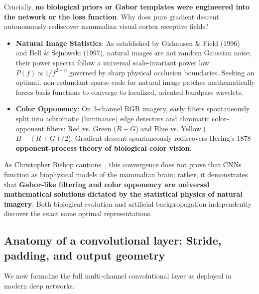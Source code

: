 Crucially, \textbf{no biological priors or Gabor templates were engineered into the network or the loss function}. Why does pure gradient descent autonomously rediscover mammalian visual cortex receptive fields?
\begin{itemize}[leftmargin=*]
  \item \textbf{Natural Image Statistics}: As established by Olshausen \& Field (1996)~\cite{olshausen1996emergence} and Bell \& Sejnowski (1997), natural images are not random Gaussian noise; their power spectra follow a universal scale-invariant power law $P(f) \propto 1/f^{2-\eta}$ governed by sharp physical occlusion boundaries. Seeking an optimal, non-redundant sparse code for natural image patches mathematically forces basis functions to converge to localized, oriented bandpass wavelets.
  \item \textbf{Color Opponency}: On 3-channel RGB imagery, early filters spontaneously split into achromatic (luminance) edge detectors and chromatic color-opponent filters: Red vs. Green ($R - G$) and Blue vs. Yellow ($B - (R+G)/2$). Gradient descent spontaneously rediscovers Hering's 1878 \textbf{opponent-process theory of biological color vision}.
\end{itemize}

As Christopher Bishop cautions~\cite{bishop2024deep}, this convergence does not prove that CNNs function as biophysical models of the mammalian brain; rather, it demonstrates that \textbf{Gabor-like filtering and color opponency are universal mathematical solutions dictated by the statistical physics of natural imagery}. Both biological evolution and artificial backpropagation independently discover the exact same optimal representations.

\subsection{Anatomy of a convolutional layer: Stride, padding, and output geometry}
\label{sec:conv_layer_anatomy}

We now formalize the full multi-channel convolutional layer as deployed in modern deep networks.

